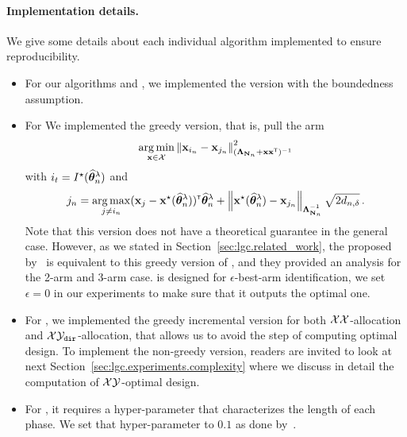 \paragraph{Implementation details.}
We give some details about each individual algorithm implemented to ensure reproducibility.

\begin{itemize}
	\item For our algorithms \LG and \LGC, we implemented the version with the boundedness assumption.
	\item For \LGapE We implemented the greedy version, that is, pull the arm 
	\[
	    \operatorname*{arg\,min}_{{\bf x}\in\mathcal{X}} \left\lVert{\bf x}_{i_n}-{\bf x}_{j_n}\right\rVert_{({\boldsymbol \Lambda}_{{\bf N}_n}+{\bf x}{\bf x}^\mathsf{\scriptscriptstyle T})^{-1}}^2
	\]
	with $i_t = I^\star(\widehat{{\boldsymbol \theta}}_n^\lambda)$ and 
	\[
	    j_n = \operatorname*{arg\,max}_{j\neq i_n}({\bf x}_{j}-{\bf x}^\star(\widehat{{\boldsymbol \theta}}_n^\lambda))^\mathsf{\scriptscriptstyle T}\widehat{{\boldsymbol \theta}}_n^\lambda + \left\lVert{\bf x}^\star(\widehat{{\boldsymbol \theta}}_n^\lambda) - {\bf x}_{j_n}\right\rVert_{{\boldsymbol \Lambda}_{{\bf N}_n}^{-1}} \sqrt{2d_{n,\delta}}\,.
	\]
	Note that this version does not have a theoretical guarantee in the general case. However, as we stated in Section~\ref{sec:lgc.related_work}, the \GLUCB proposed by~\citet{zaki2019maxoverlap} is equivalent to this greedy version of \LGapE, and they provided an analysis for the 2-arm and 3-arm case. \LGapE is designed for $\epsilon$-best-arm identification, we set $\epsilon=0$ in our experiments to make sure that it outputs the optimal one.
	\item For \XYS, we implemented the greedy incremental version for both $\mathcal{X}\mathcal{X}$-allocation and $\mathcal{X}\mathcal{Y}_{\texttt{dir}}$-allocation, that allows us to avoid the step of computing optimal design. To implement the non-greedy version, readers are invited to look at next Section~\ref{sec:lgc.experiments.complexity} where we discuss in detail the computation of $\mathcal{X}\mathcal{Y}$-optimal design.
	\item For \XYA, it requires a hyper-parameter that characterizes the length of each phase. We set that hyper-parameter to $0.1$ as done by~\citet{soare2014linear}.
\end{itemize}


